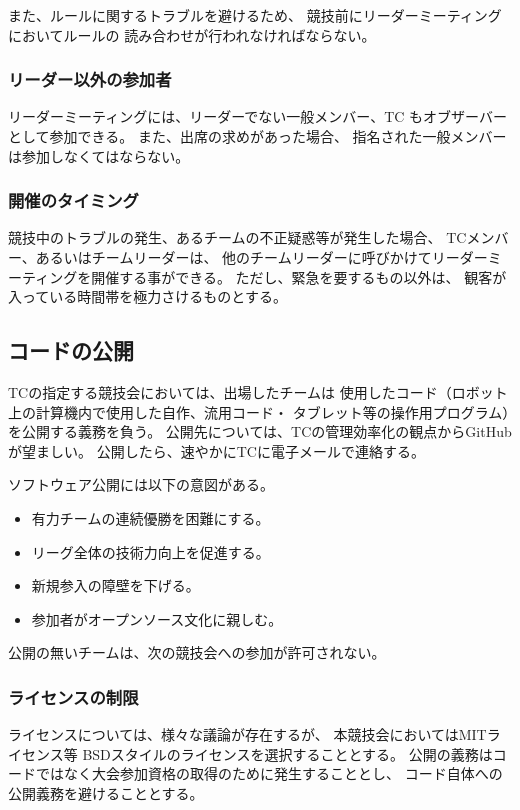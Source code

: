 \documentclass[a4j]{jarticle}
\begin{document}
また、ルールに関するトラブルを避けるため、
競技前にリーダーミーティングにおいてルールの
読み合わせが行われなければならない。

\subsubsection{リーダー以外の参加者}

リーダーミーティングには、リーダーでない一般メンバー、TC
もオブザーバーとして参加できる。
また、出席の求めがあった場合、
指名された一般メンバーは参加しなくてはならない。

\subsubsection{開催のタイミング}

競技中のトラブルの発生、あるチームの不正疑惑等が発生した場合、
TCメンバー、あるいはチームリーダーは、
他のチームリーダーに呼びかけてリーダーミーティングを開催する事ができる。
ただし、緊急を要するもの以外は、
観客が入っている時間帯を極力さけるものとする。

\subsection{コードの公開}

TCの指定する競技会においては、出場したチームは
使用したコード（ロボット上の計算機内で使用した自作、流用コード・
タブレット等の操作用プログラム）を公開する義務を負う。
公開先については、TCの管理効率化の観点からGitHubが望ましい。
公開したら、速やかにTCに電子メールで連絡する。


ソフトウェア公開には以下の意図がある。
\begin{itemize}
	\item 有力チームの連続優勝を困難にする。
	\item リーグ全体の技術力向上を促進する。
	\item 新規参入の障壁を下げる。
	\item 参加者がオープンソース文化に親しむ。
\end{itemize}
公開の無いチームは、次の競技会への参加が許可されない。

\subsubsection{ライセンスの制限}

ライセンスについては、様々な議論が存在するが、
本競技会においてはMITライセンス等
BSDスタイルのライセンスを選択することとする。
公開の義務はコードではなく大会参加資格の取得のために発生することとし、
コード自体への公開義務を避けることとする。
\end{document}
